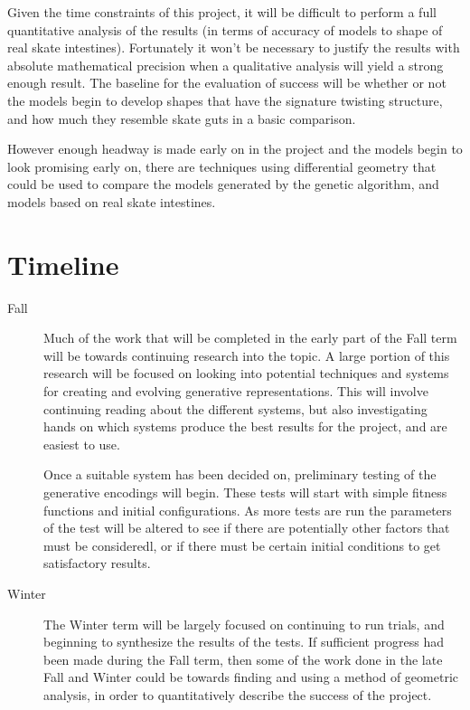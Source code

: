 \documentclass[condensed]{union-cs-thesis}
\begin{document}
Given the time constraints of this project, it will be difficult to perform a full quantitative analysis
of the results (in terms of accuracy of models to shape of real skate intestines).  Fortunately it won't be
necessary to justify the results with absolute mathematical precision when a qualitative analysis will
yield a strong enough result.  The baseline for the evaluation of success will be whether or not the models
begin to develop shapes that have the signature twisting structure, and how much they resemble skate guts in
a basic comparison.
\par
However enough headway is made early on in the project and the models begin to look promising early on, there
are techniques using differential geometry that could be used to compare the models generated by the genetic
algorithm, and models based on real skate intestines.

\section{Timeline}

\begin{description}
\item[Fall] Much of the work that will be completed in the early part of the Fall term will be towards continuing
  research into the topic.  A large portion of this research will be focused on looking into potential techniques
  and systems for creating and evolving generative representations.  This will involve continuing reading
  about the different systems, but also investigating hands on which systems produce the best results for
  the project, and are easiest to use.
  \par
  Once a suitable system has been decided on, preliminary testing of the generative encodings will begin.
  These tests will start with simple fitness functions and initial configurations.  As more tests are run
  the parameters of the test will be altered to see if there are potentially other factors that must be
  consideredl, or if there must be certain initial conditions to get satisfactory results.
\item[Winter] The Winter term will be largely focused on continuing to run trials, and beginning to synthesize the
  results of the tests.  If sufficient progress had been made during the Fall term, then some of the work
  done in the late Fall and Winter could be towards finding and using a method of geometric analysis, in order
  to quantitatively describe the success of the project.
\end{description}




\end{document}
